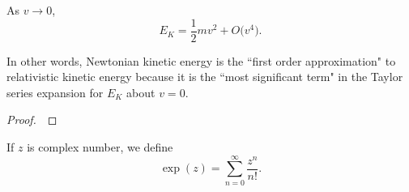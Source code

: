\begin{theorem}
As $v\to 0$,
\begin{equation*}
E_K = \frac{1}{2}mv^2 + O\big(v^4\big).
\end{equation*}
\end{theorem}
\begin{remark}
In other words, Newtonian kinetic energy is the ``first order approximation" to relativistic kinetic energy because it is the ``most significant term" in the Taylor series expansion for $E_K$ about $v=0$.
\end{remark}
\ifdefined\SOLUTION
{}
\else
\begin{proof}
\,
\vspace{3.1in}

\end{proof}
\fi

\newpage


\begin{definition}
If $z$ is complex number, we define
\begin{equation*}
\exp(z) = \sum_{n=0}^\infty \frac{z^n}{n!}.
\end{equation*}
\end{definition}

